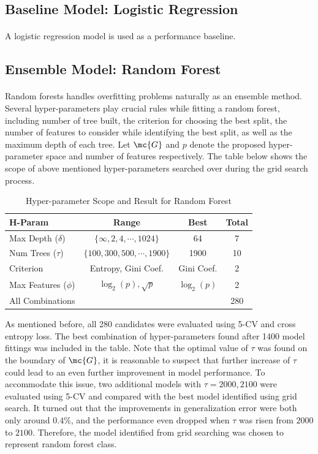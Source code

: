 \documentclass[11pt]{article}
\begin{document}
	\subsection{Baseline Model: Logistic Regression}
	\paragraph{} A logistic regression model is used as a performance baseline.
 	
 	\subsection{Ensemble Model: Random Forest}
 	\paragraph{} Random forests handles overfitting problems naturally as an ensemble method. Several hyper-parameters play crucial rules while fitting a random forest, including number of tree built, the criterion for choosing the best split, the number of features to consider while identifying the best split, as well as the maximum depth of each tree. Let $\mc{G}$ and $p$ denote the proposed hyper-parameter space and number of features respectively. The table below shows the scope of above mentioned hyper-parameters searched over during the grid search process.
 	\begin{table}[H]
 		\centering
 		\begin{tabular}{l|c|c|c}
 		H-Param & Range & Best & Total \\
 		\hline
 		Max Depth ($\delta$) & $\{\infty, 2, 4, \cdots, 1024\}$ & 64 & 7 \\
 		Num Trees ($\tau$) & $\{100, 300, 500, \cdots, 1900\}$ & 1900 & 10 \\
 		Criterion & Entropy, Gini Coef. & Gini Coef. & 2 \\
 		Max Features ($\phi$) & $\log_2(p), \sqrt{p}$ & $\log_2(p)$ & 2\\
 		\hline 
 		All Combinations& & & 280
		\end{tabular}
		\caption{Hyper-parameter Scope and Result for Random Forest}
 	\end{table}
 	As mentioned before, all 280 candidates were evaluated using 5-CV and cross entropy loss. The best combination of hyper-parameters found after 1400 model fittings was included in the table. Note that the optimal value of $\tau$ was found on the boundary of $\mc{G}$, it is reasonable to suspect that further increase of $\tau$ could lead to an even further improvement in model performance. To accommodate this issue, two additional models with $\tau=2000, 2100$ were evaluated using 5-CV and compared with the best model identified using grid search. It turned out that the improvements in generalization error were both only around $0.4\%$, and the performance even dropped when $\tau$ was risen from $2000$ to $2100$. Therefore, the model identified from grid searching was chosen to represent random forest class.
 	
\end{document}
